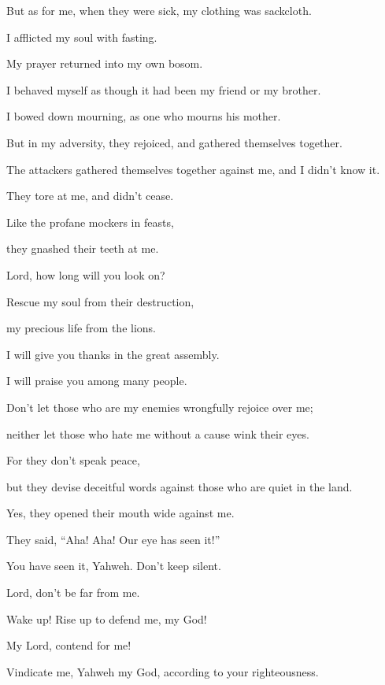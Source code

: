 {\par }{\BB \par }{\Q {}But as for me, when they were sick, my clothing was sackcloth.
\par }{\QB I afflicted my soul with fasting.
\par }{\QB My prayer returned into my own bosom.
\par }{\Q {}I behaved myself as though it had been my friend or my brother.
\par }{\QB I bowed down mourning, as one who mourns his mother.
\par }{\Q {}But in my adversity, they rejoiced, and gathered themselves together.
\par }{\QB The attackers gathered themselves together against me, and I didn’t know it.
\par }{\QB They tore at me, and didn’t cease.
\par }{\Q {}Like the profane mockers in feasts,
\par }{\QB they gnashed their teeth at me.
\par }{\Q {}Lord, how long will you look on?
\par }{\QB Rescue my soul from their destruction,
\par }{\QB my precious life from the lions.
\par }{\Q {}I will give you thanks in the great assembly.
\par }{\QB I will praise you among many people.
\par }{\Q {}Don’t let those who are my enemies wrongfully rejoice over me;
\par }{\QB neither let those who hate me without a cause wink their eyes.
\par }{\Q {}For they don’t speak peace,
\par }{\QB but they devise deceitful words against those who are quiet in the land.
\par }{\Q {}Yes, they opened their mouth wide against me.
\par }{\QB They said, “Aha! Aha! Our eye has seen it!”
\par }{\Q {}You have seen it, Yahweh. Don’t keep silent.
\par }{\QB Lord, don’t be far from me.
\par }{\Q {}Wake up! Rise up to defend me, my God!
\par }{\QB My Lord, contend for me!
\par }{\Q {}Vindicate me, Yahweh my God, according to your righteousness.
}
